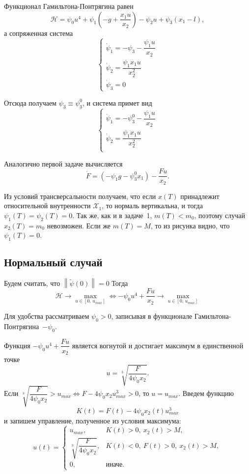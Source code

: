 \documentclass[16pt]{article}
\newcommand\Norm[1]{\left\| #1 \right\|}
\newcommand\X{\mathcal{X}}
\begin{document}
Функционал Гамильтона-Понтрягина равен 
$$\mathcal{H} = \psi_0 u^4 + \psi_1\left(-g + \dfrac{x_1u}{x_2}\right) - \psi_2u + \psi_3(x_1 - l),$$
а сопряженная система 
$$
\begin{cases}
\dot{\psi}_1 = -\psi_3 -\dfrac{\psi_1u}{x_2}\\
\dot{\psi}_2 = \dfrac{\psi_1 x_1 u}{x_2^2} \\
\dot{\psi}_3 = 0
\end{cases}
$$

Отсюда получаем $\psi_3 \equiv \psi_3^0$, и система примет вид
\begin{equation}
\begin{cases} \label{2_conj_syst}
\dot{\psi}_1 = -\psi_3^0 -\dfrac{\psi_1u}{x_2}\\
\dot{\psi}_2 = \dfrac{\psi_1 x_1 u}{x_2^2} \\
\end{cases}
\end{equation}

Аналогично первой задаче вычисляется
\begin{equation} \label{2_F_ode}
\dot{F} = (-\psi_1g - \psi_3^0 x_1) - \dfrac{Fu}{x_2}.
\end{equation}

Из условий трансверсальности получаем, что если $x(T)$ принадлежит относительной внутренности $\X_1$, то
нормаль вертикальна, и тогда $\psi_1(T) = \psi_2(T) = 0$. Так же, как и в задаче~1, $m(T) < m_0$, поэтому
случай $x_2(T) = m_0$ невозможен. Если же $m(T) = M$, то из рисунка видно, что $\psi_1(T) = 0$.

\subsection{Нормальный случай}
Будем считать, что $\Norm{\tilde{\psi}(0)} = 0$ Тогда
$$\mathcal{H} \to \max_{u \in [0,\,u_{max}]} \Leftrightarrow -\psi_0u^4 + \dfrac{Fu}{x_2} \to 
\max_{u \in [0,\,u_{max}]}$$

Для удобства рассматриваем $\psi_0 > 0$, записывая в функционале Гамильтона-Понтрягина~$-\psi_0$.

Функция $-\psi_0u^4 + \dfrac{Fu}{x_2}$ является вогнутой и достигает максимум в единственной точке
$$u = \sqrt[3]{\dfrac{F}{4\psi_0x_2}}.$$
Если $\sqrt[3]{\dfrac{F}{4\psi_0x_2}} > u_{max} \Leftrightarrow F - 4\psi_0x_2u_{max}^3 > 0$, то $u = u_{max}$.
Введем функцию $$K(t) = F(t) - 4\psi_0x_2(t)u_{max}^3$$ и запишем управление, полученное из условия максимума:
 \begin{equation} \label{oc_2}
 u(t) = 
 \begin{cases}
 u_{max}, & K(t) > 0,\  x_2(t) > M, \\
 \sqrt[3]{\dfrac{F}{4\psi_0x_2}}, & K(t) < 0,\ F(t) > 0, \ x_2(t) > M, \\
 0, &\text{иначе.}
 \end{cases}
 \end{equation}
\end{document}
